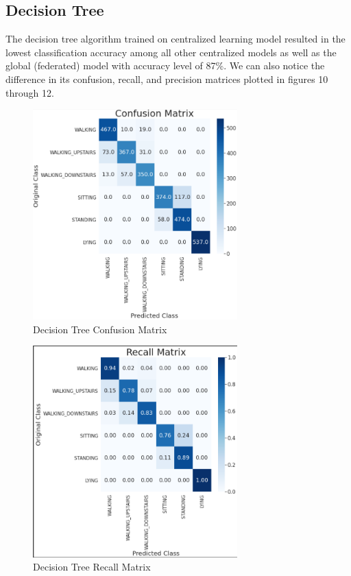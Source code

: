 \documentclass[12pt,conference]{IEEEtran}
\begin{document}
\subsection{Decision Tree}
The decision tree algorithm trained on centralized learning model resulted in the lowest classification accuracy among all other centralized models as well as the global (federated) model with accuracy level of 87\%. We can also notice the difference in its confusion, recall, and precision matrices plotted in figures 10 through 12.\\

\begin{figure} [!t]
	\centering
	\includegraphics[width=3.1in]{tree_cm.PNG}
	\caption{Decision Tree Confusion Matrix}
	\label{}
\end{figure}
\begin{figure} [!t]
	\centering
	\includegraphics[width=3.1in]{tree_recall.PNG}
	\caption{Decision Tree Recall Matrix}
	\label{}
\end{figure}
\end{document}
